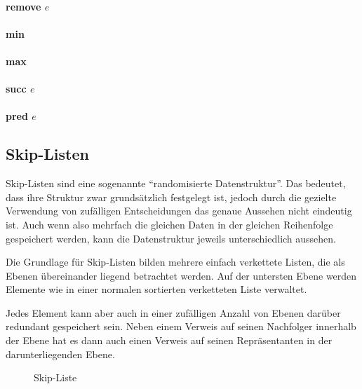 \paragraph{remove $e$}
\paragraph{min}
\paragraph{max}
\paragraph{succ $e$}
\paragraph{pred $e$}


\subsection{Skip-Listen}
\label{subsec:SkipListen}

Skip-Listen sind eine sogenannte "`randomisierte Datenstruktur"'.
Das bedeutet, dass ihre Struktur zwar grundsätzlich festgelegt ist,
jedoch durch die gezielte Verwendung von zufälligen Entscheidungen das genaue Aussehen nicht eindeutig ist.
Auch wenn also mehrfach die gleichen Daten in der gleichen Reihenfolge gespeichert werden,
kann die Datenstruktur jeweils unterschiedlich aussehen.

Die Grundlage für Skip-Listen bilden mehrere einfach verkettete Listen,
die als Ebenen übereinander liegend betrachtet werden.
Auf der untersten Ebene werden Elemente wie in einer normalen sortierten verketteten Liste verwaltet.

Jedes Element kann aber auch in einer zufälligen Anzahl von Ebenen darüber redundant gespeichert sein.
Neben einem Verweis auf seinen Nachfolger innerhalb der Ebene hat es dann auch einen Verweis auf seinen Repräsentanten in der darunterliegenden Ebene.

\begin{figure}[h]%
\caption{Skip-Liste}
\label{fig:SkipListe}
\end{figure}

